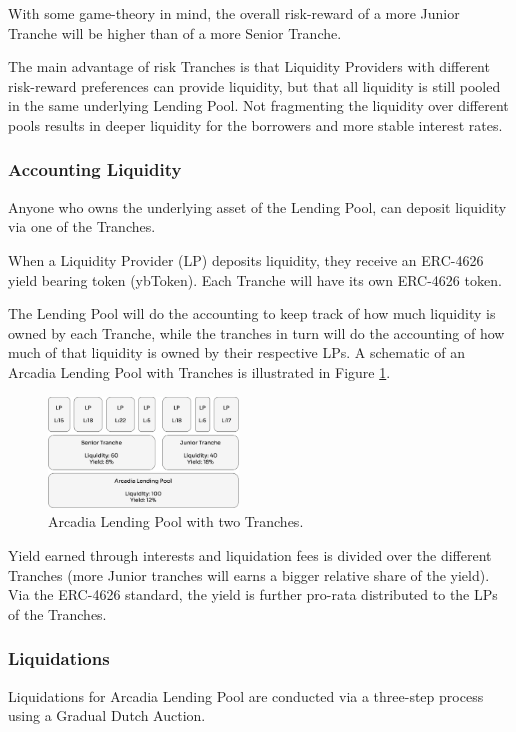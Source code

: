 \documentclass[sigconf,nonacm]{acmart}
\begin{document}
With some game-theory in mind, the overall risk-reward of a more Junior Tranche will be higher than of a more Senior Tranche.

The main advantage of risk Tranches is that Liquidity Providers with different risk-reward preferences can provide liquidity,
but that all liquidity is still pooled in the same underlying Lending Pool.
Not fragmenting the liquidity over different pools results in deeper liquidity for the borrowers and more stable interest rates.

\subsubsection{Accounting Liquidity}
\label{subsubsec:accounting-liquidity}
Anyone who owns the underlying asset of the Lending Pool, can deposit liquidity via one of the Tranches.

When a Liquidity Provider (LP) deposits liquidity, they receive an ERC-4626 yield bearing token (ybToken).
Each Tranche will have its own ERC-4626 token.

The Lending Pool will do the accounting to keep track of how much liquidity is owned by each Tranche,
while the tranches in turn will do the accounting of how much of that liquidity is owned by their respective LPs.
A schematic of an Arcadia Lending Pool with Tranches is illustrated in Figure \ref{fig:tranches}.

\begin{figure}
    \centering
    \includegraphics[width=0.45\textwidth]{images/Tranches.png}
    \caption{Arcadia Lending Pool with two Tranches. \label{fig:tranches}}
\end{figure}

Yield earned through interests and liquidation fees is divided over the different Tranches
(more Junior tranches will earns a bigger relative share of the yield).
Via the ERC-4626 standard, the yield is further pro-rata distributed to the LPs of the Tranches.

\subsubsection{Liquidations}
\label{subsubsec:liquidations}
Liquidations for Arcadia Lending Pool are conducted via a three-step process using a Gradual Dutch Auction.
\end{document}
